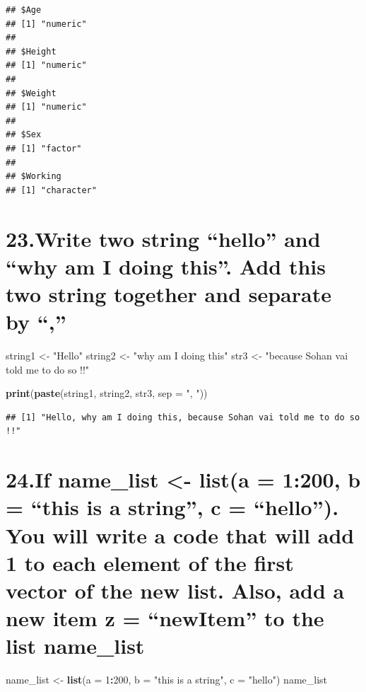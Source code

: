 \documentclass[]{article}
\newenvironment{Shaded}{\begin{snugshade}}{\end{snugshade}}
\newcommand{\DataTypeTok}[1]{\textcolor[rgb]{0.13,0.29,0.53}{#1}}
\newcommand{\DecValTok}[1]{\textcolor[rgb]{0.00,0.00,0.81}{#1}}
\newcommand{\KeywordTok}[1]{\textcolor[rgb]{0.13,0.29,0.53}{\textbf{#1}}}
\newcommand{\NormalTok}[1]{#1}
\newcommand{\OperatorTok}[1]{\textcolor[rgb]{0.81,0.36,0.00}{\textbf{#1}}}
\newcommand{\StringTok}[1]{\textcolor[rgb]{0.31,0.60,0.02}{#1}}
\begin{document}
\begin{verbatim}
## $Age
## [1] "numeric"
## 
## $Height
## [1] "numeric"
## 
## $Weight
## [1] "numeric"
## 
## $Sex
## [1] "factor"
## 
## $Working
## [1] "character"
\end{verbatim}

\hypertarget{write-two-string-hello-and-why-am-i-doing-this.-add-this-two-string-together-and-separate-by}{%
\section{23.Write two string ``hello'' and ``why am I doing this''. Add
this two string together and separate by
``,''}\label{write-two-string-hello-and-why-am-i-doing-this.-add-this-two-string-together-and-separate-by}}

\begin{Shaded}
\begin{Highlighting}[]
\NormalTok{string1 <-}\StringTok{ "Hello"}
\NormalTok{string2 <-}\StringTok{ "why am I doing this"}
\NormalTok{str3 <-}\StringTok{ "because Sohan vai told me to do so !!"}

\KeywordTok{print}\NormalTok{(}\KeywordTok{paste}\NormalTok{(string1, string2, str3, }\DataTypeTok{sep =} \StringTok{", "}\NormalTok{))}
\end{Highlighting}
\end{Shaded}

\begin{verbatim}
## [1] "Hello, why am I doing this, because Sohan vai told me to do so !!"
\end{verbatim}

\hypertarget{if-name_list---lista-1200-b-this-is-a-string-c-hello.-you-will-write-a-code-that-will-add-1-to-each-element-of-the-first-vector-of-the-new-list.-also-add-a-new-item-z-newitem-to-the-list-name_list}{%
\section{24.If name\_list \textless{}- list(a = 1:200, b = ``this is a
string'', c = ``hello''). You will write a code that will add 1 to each
element of the first vector of the new list. Also, add a new item z =
``newItem'' to the list
name\_list}\label{if-name_list---lista-1200-b-this-is-a-string-c-hello.-you-will-write-a-code-that-will-add-1-to-each-element-of-the-first-vector-of-the-new-list.-also-add-a-new-item-z-newitem-to-the-list-name_list}}

\begin{Shaded}
\begin{Highlighting}[]
\NormalTok{name_list <-}\StringTok{ }\KeywordTok{list}\NormalTok{(}\DataTypeTok{a =} \DecValTok{1}\OperatorTok{:}\DecValTok{200}\NormalTok{, }\DataTypeTok{b =} \StringTok{"this is a string"}\NormalTok{, }\DataTypeTok{c =} \StringTok{"hello"}\NormalTok{)}
\NormalTok{name_list}
\end{Highlighting}
\end{Shaded}
\end{document}
